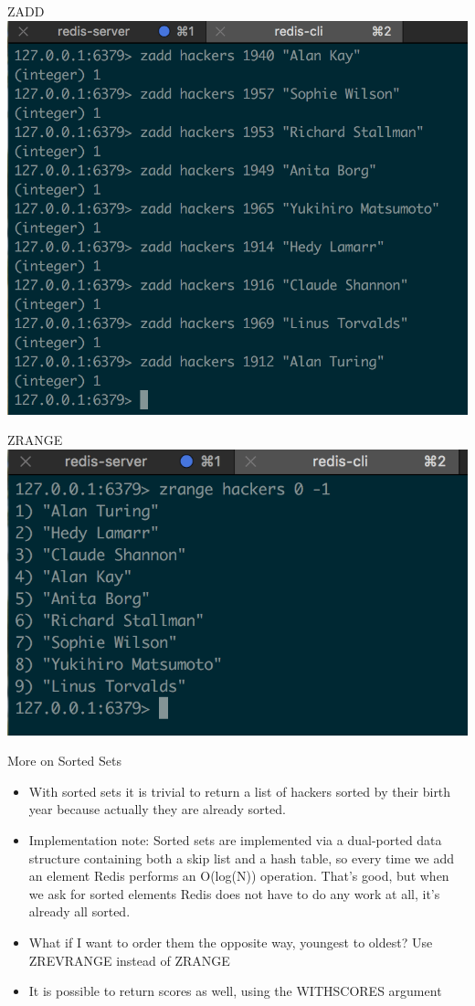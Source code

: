 \documentclass[10pt]{beamer}
\begin{document}
\begin{frame}[fragile]{ZADD}
  \includegraphics[scale=0.6]{img/zadd}
\end{frame}

\begin{frame}[fragile]{ZRANGE}
  \includegraphics[scale=0.8]{img/zrange}
\end{frame}

\begin{frame}[fragile]{More on Sorted Sets}
  \begin{itemize}
    \item With sorted sets it is trivial to return a list of hackers sorted by
    their birth year because actually they are already sorted.
    \item Implementation note: Sorted sets are implemented via a dual-ported
    data structure containing both a skip list and a hash table, so every time
    we add an element Redis performs an O(log(N)) operation.
    That's good, but when we ask for sorted elements Redis does not have to do
    any work at all, it's already all sorted.
    \item What if I want to order them the opposite way, youngest to oldest?
    Use ZREVRANGE instead of ZRANGE
    \item It is possible to return scores as well, using the WITHSCORES argument
  \end{itemize}
\end{frame}
\end{document}
